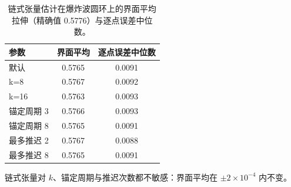 \begin{table}[!htbp]\centering\small\caption{链式张量估计在爆炸波圆环上的界面平均拉伸（精确值 0.5776）与逐点误差中位数。}\begin{tabular}{lcc}\toprule 参数 & 界面平均 & 逐点误差中位数\\\midrule
默认 & 0.5765 & 0.0091\\
k=8 & 0.5767 & 0.0092\\
k=16 & 0.5763 & 0.0093\\
锚定周期 3 & 0.5766 & 0.0093\\
锚定周期 8 & 0.5765 & 0.0091\\
最多推迟 2 & 0.5767 & 0.0088\\
最多推迟 8 & 0.5765 & 0.0091\\
\bottomrule\end{tabular}\end{table}链式张量对 $k$、锚定周期与推迟次数都不敏感：界面平均在 $\pm2\times10^{-4}$ 内不变。
